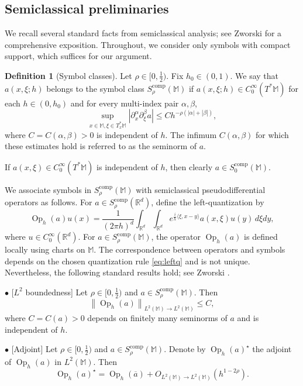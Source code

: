 \documentclass[12pt,reqno]{amsart}
\DeclareMathOperator{\Op}{Op}
\newcommand{\comp}{\mathrm{comp}}
\newcommand{\M}{\mathbb{M}}
\newcommand{\ol}{\overline}
\newcommand{\R}{\mathbb{R}}
\theoremstyle{plain}
\theoremstyle{definition}
\newtheorem*{defn}{Definition}
\theoremstyle{remark}
\numberwithin{equation}{section}
\begin{document}
\subsection{Semiclassical preliminaries}\label{sec:SA}
We recall several standard facts from semiclassical analysis; see Zworski \cite{Zw} for a comprehensive exposition. Throughout, we consider only symbols with compact support, which suffices for our argument.

\begin{defn}[Symbol classes]
Let $\rho\in[0,\frac12)$. Fix $h_0\in(0,1)$. We say that $a(x,\xi;h)$ belongs to the symbol class $S_\rho^\comp(\M)$ if $a(x,\xi;h)\in C_0^\infty(T^*\M)$ for each $h\in(0,h_0)$ and for every multi-index pair $\alpha,\beta$,
$$\sup_{x\in\M,\xi\in T_x^*\M}\left|\partial^\alpha_x\partial^\beta_\xi a\right|\le Ch^{-\rho(|\alpha|+|\beta|)},$$
where $C=C(\alpha,\beta)>0$ is independent of $h$. The infimum $C(\alpha,\beta)$ for which these estimates hold is referred to as the seminorm of $a$. 
\end{defn}

If $a(x,\xi)\in C_0^\infty(T^*\M)$ is independent of $h$, then clearly $a\in S_0^\comp(\M)$.
  
We associate symbols in $S_\rho^\comp(\M)$ with semiclassical pseudodifferential operators as follows.  
For $a\in S_\rho^\comp(\R^d)$, define the left-quantization by
\begin{equation}\label{eq:leftq}
\Op_h(a)u(x)=\frac{1}{(2\pi h)^d}\int_{\R^d}\int_{\R^d}e^{\frac ih\langle\xi,x-y\rangle}a(x,\xi)u(y)\,d\xi dy,
\end{equation}
where $u\in C_0^\infty(\R^d)$. For $a\in S_\rho^\comp(\M)$, the operator $\Op_h(a)$ is defined locally using charts on $\M$.  
The correspondence between operators and symbols depends on the chosen quantization rule \eqref{eq:leftq} and is not unique. Nevertheless, the following standard results hold; see Zworski \cite[Sections 4.4 and 4.5]{Zw}.

$\bullet$ [$L^2$ boundedness]  
Let $\rho\in[0,\frac12)$ and $a\in S_\rho^\comp(\M)$. Then 
\begin{equation}\label{eq:OpL2}
\left\|\Op_h(a)\right\|_{L^2(\M)\to L^2(\M)}\le C,
\end{equation} 
where $C=C(a)>0$ depends on finitely many seminorms of $a$ and is independent of $h$.

$\bullet$ [Adjoint] Let $\rho\in[0,\frac12)$ and $a\in S_\rho^\comp(\M)$. Denote by $\Op_h(a)^\star$ the adjoint of $\Op_h(a)$ in $L^2(\M)$. Then
\begin{equation}\label{eq:adjoint}
\Op_h(a)^\star=\Op_h\left(\ol a\right)+O_{L^2(\M)\to L^2(\M)}\left(h^{1-2\rho}\right).
\end{equation}
\end{document}
